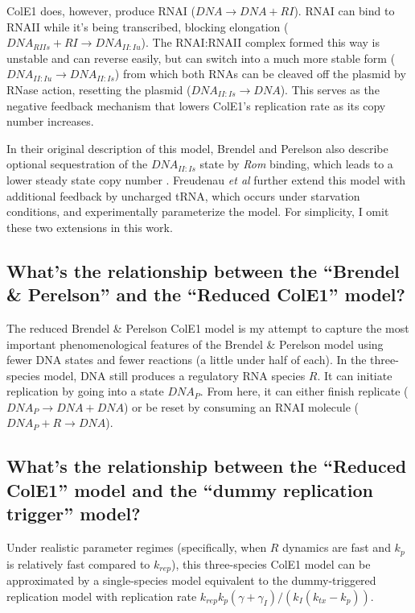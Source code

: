\documentclass[preprint,12pt]{oldplainarticle}
\begin{document}
ColE1 does, however, produce RNAI ($DNA \to DNA + RI$). RNAI can bind to RNAII while it's being transcribed, blocking elongation ($DNA_{RIIs} + RI \to DNA_{II:Iu}$). The RNAI:RNAII complex formed this way is unstable and can reverse easily, but can switch into a much more stable form ($DNA_{II:Iu} \to DNA_{II:Is}$) from which both RNAs can be cleaved off the plasmid by RNase action, resetting the plasmid ($DNA_{II:Is} \to DNA$). This serves as the negative feedback mechanism that lowers ColE1's replication rate as its copy number increases.

In their original description of this model, Brendel and Perelson also describe optional sequestration of the $DNA_{II:Is}$ state by \emph{Rom} binding, which leads to a lower steady state copy number \cite{Brendel1993}. Freudenau \emph{et al} further extend this model with additional feedback by uncharged tRNA, which occurs under starvation conditions, and experimentally parameterize the model. For simplicity, I omit these two extensions in this work.

\subsection{What's the relationship between the ``Brendel \& Perelson'' and the ``Reduced ColE1'' model?}

The reduced Brendel \& Perelson ColE1 model is my attempt to capture the most important phenomenological features of the Brendel \& Perelson model using fewer DNA states and fewer reactions (a little under half of each). In the three-species model, DNA still produces a regulatory RNA species $R$. It can initiate replication by going into a state $DNA_P$. From here, it can either finish replicate ($DNA_P \to DNA + DNA$) or be reset by consuming an RNAI molecule ($DNA_P + R \to DNA$). 

\subsection{What's the relationship between the ``Reduced ColE1'' model and the ``dummy replication trigger'' model?}\label{sec:simple_bp_reduction}

Under realistic parameter regimes (specifically, when $R$ dynamics are fast and $k_p$ is relatively fast compared to $k_{rep}$), this three-species ColE1 model can be approximated by a single-species model equivalent to the dummy-triggered replication model with replication rate $k_{rep}k_p(\gamma + \gamma_I) / (k_I(k_{tx} - k_p))$. 
\end{document}
